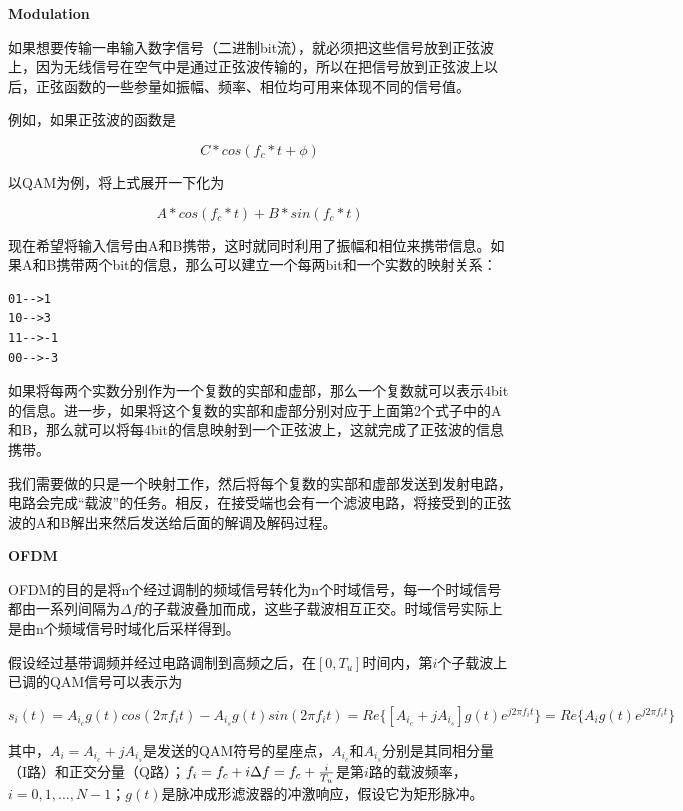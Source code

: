 \documentclass[titlepage]{article}
\numberwithin{figure}{section}
\numberwithin{equation}{section}
\begin{document}
\textbf{Modulation}

如果想要传输一串输入数字信号（二进制bit流），就必须把这些信号放到正弦波上，因为无线信号在空气中是通过正弦波传输的，所以在把信号放到正弦波上以后，正弦函数的一些参量如振幅、频率、相位均可用来体现不同的信号值。

例如，如果正弦波的函数是

\begin{equation}
C*cos(f_{c}*t+\phi)
\end{equation}

以QAM为例，将上式展开一下化为

\begin{equation}
A*cos(f_{c}*t)+B*sin(f_{c}*t)
\end{equation}

现在希望将输入信号由A和B携带，这时就同时利用了振幅和相位来携带信息。如果A和B携带两个bit的信息，那么可以建立一个每两bit和一个实数的映射关系：

\begin{verbatim}
01-->1
10-->3
11-->-1
00-->-3
\end{verbatim}

如果将每两个实数分别作为一个复数的实部和虚部，那么一个复数就可以表示4bit的信息。进一步，如果将这个复数的实部和虚部分别对应于上面第2个式子中的A和B，那么就可以将每4bit的信息映射到一个正弦波上，这就完成了正弦波的信息携带。

我们需要做的只是一个映射工作，然后将每个复数的实部和虚部发送到发射电路，电路会完成“载波”的任务。相反，在接受端也会有一个滤波电路，将接受到的正弦波的A和B解出来然后发送给后面的解调及解码过程。

\textbf{OFDM}

OFDM的目的是将n个经过调制的频域信号转化为n个时域信号，每一个时域信号都由一系列间隔为$\Delta f$的子载波叠加而成，这些子载波相互正交。时域信号实际上是由n个频域信号时域化后采样得到。

假设经过基带调频并经过电路调制到高频之后，在$[0,T_{u}]$时间内，第$i$个子载波上已调的QAM信号可以表示为

\begin{equation}
	s_{i}(t)=A_{i_{c}}g(t)cos(2\pi f_{i}t)-A_{i_{s}}g(t)sin(2\pi f_{i}t)
=Re\{[A_{i_{c}}+jA_{i_{s}}]g(t)e^{j2 \pi f_{i}t}\}
=Re\{A_{i}g(t)e^{j2 \pi f_{i}t}\}
\end{equation}

其中，$A_{i}=A_{i_{c}}+jA_{i_{s}}$是发送的QAM符号的星座点，$A_{i_{c}}$和$A_{i_{s}}$分别是其同相分量（I路）和正交分量（Q路）；$f_{i}=f_{c}+i\Delta f=f_{c}+{i\over T_{u}}$是第$i$路的载波频率，$i=0,1,...,N-1$；$g(t)$是脉冲成形滤波器的冲激响应，假设它为矩形脉冲。
\end{document}
